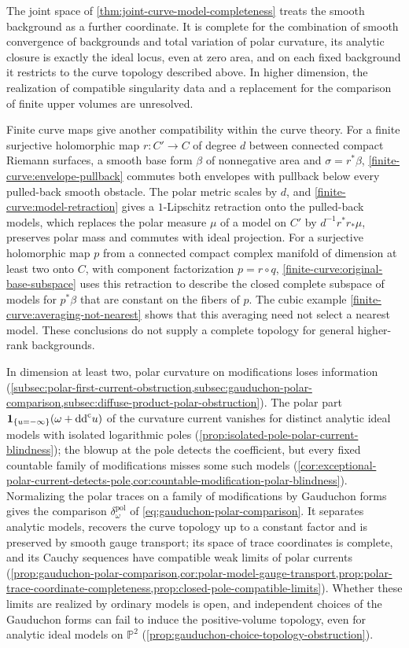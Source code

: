 The joint space of \cref{thm:joint-curve-model-completeness} treats the smooth background as a further coordinate. It is complete for the combination of smooth convergence of backgrounds and total variation of polar curvature, its analytic closure is exactly the ideal locus, even at zero area, and on each fixed background it restricts to the curve topology described above. In higher dimension, the realization of compatible singularity data and a replacement for the comparison of finite upper volumes are unresolved.

Finite curve maps give another compatibility within the curve theory. For a finite surjective holomorphic map $r\colon C'\to C$ of degree $d$ between connected compact Riemann surfaces, a smooth base form $\beta$ of nonnegative area and $\sigma=r^*\beta$, \cref{finite-curve:envelope-pullback} commutes both envelopes with pullback below every pulled-back smooth obstacle. The polar metric scales by $d$, and \cref{finite-curve:model-retraction} gives a $1$-Lipschitz retraction onto the pulled-back models, which replaces the polar measure $\mu$ of a model on $C'$ by $d^{-1}r^*r_*\mu$, preserves polar mass and commutes with ideal projection. For a surjective holomorphic map $p$ from a connected compact complex manifold of dimension at least two onto $C$, with component factorization $p=r\circ q$, \cref{finite-curve:original-base-subspace} uses this retraction to describe the closed complete subspace of models for $p^*\beta$ that are constant on the fibers of $p$. The cubic example \cref{finite-curve:averaging-not-nearest} shows that this averaging need not select a nearest model. These conclusions do not supply a complete topology for general higher-rank backgrounds.

In dimension at least two, polar curvature on modifications loses information (\cref{subsec:polar-first-current-obstruction,subsec:gauduchon-polar-comparison,subsec:diffuse-product-polar-obstruction}). The polar part $\mathbf1_{\{u=-\infty\}}(\omega+\mathrm{dd}^{\mathrm{c}} u)$ of the curvature current vanishes for distinct analytic ideal models with isolated logarithmic poles (\cref{prop:isolated-pole-polar-current-blindness}); the blowup at the pole detects the coefficient, but every fixed countable family of modifications misses some such models (\cref{cor:exceptional-polar-current-detects-pole,cor:countable-modification-polar-blindness}). Normalizing the polar traces on a family of modifications by Gauduchon forms gives the comparison $\delta^{\mathrm{pol}}_\omega$ of \eqref{eq:gauduchon-polar-comparison}. It separates analytic models, recovers the curve topology up to a constant factor and is preserved by smooth gauge transport; its space of trace coordinates is complete, and its Cauchy sequences have compatible weak limits of polar currents (\cref{prop:gauduchon-polar-comparison,cor:polar-model-gauge-transport,prop:polar-trace-coordinate-completeness,prop:closed-pole-compatible-limits}). Whether these limits are realized by ordinary models is open, and independent choices of the Gauduchon forms can fail to induce the positive-volume topology, even for analytic ideal models on $\mathbb P^2$ (\cref{prop:gauduchon-choice-topology-obstruction}).

